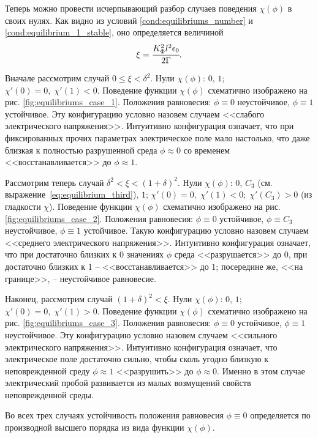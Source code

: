 Теперь можно провести исчерпывающий разбор случаев поведения $\chi(\phi)$ в своих нулях. Как видно из условий \eqref{cond:equilibriums_number} и \eqref{cond:equilibrium_1_stable}, оно определяется величиной
\begin{equation}
	\xi = \cfrac{K_\Phi^2 l^2 \epsilon_0}{2 \Gamma} {\text{.}}
	\label{char:equilibriums}
\end{equation}

Вначале рассмотрим случай $0 \leqslant \xi < \delta^2$. Нули $\chi(\phi)$: $0$, $1$; $\chi'(0) = 0, \; \chi'(1) < 0$. Поведение функции $\chi(\phi)$ схематично изображено на рис. \ref{fig:equilibriums_case_1}. Положения равновесия: $\phi \equiv 0$ неустойчивое, $\phi \equiv 1$ устойчивое. Эту конфигурацию условно назовем случаем <<слабого электрического напряжения>>. Интуитивно конфигурация означает, что при фиксированных прочих параметрах электрическое поле мало настолько, что даже близкая к полностью разрушенной среда $\phi \approx 0$ со временем <<восстанавливается>> до $\phi \approx 1$.

Рассмотрим теперь случай $\delta^2 < \xi < (1 + \delta)^2$. Нули $\chi(\phi)$: $0$, $C_3$ (см. выражение~\eqref{eq:equilibrium_third}), $1$; $\chi'(0) = 0, \; \chi'(1) < 0; \; \chi'(C_3) > 0$ (из гладкости $\chi$). Поведение функции $\chi(\phi)$ схематично изображено на рис. \ref{fig:equilibriums_case_2}. Положения равновесия: $\phi \equiv 0$ устойчивое, $\phi \equiv C_3$ неустойчивое, $\phi \equiv 1$ устойчивое. Такую конфигурацию условно назовем случаем <<среднего электрического напряжения>>. Интуитивно конфигурация означает, что при достаточно близких к $0$ значениях $\phi$ среда <<разрушается>> до $0$, при достаточно близких к $1$ -- <<восстанавливается>> до $1$; посередине же, <<на границе>>, -- неустойчивое равновесие.

Наконец, рассмотрим случай $(1 + \delta)^2 < \xi$. Нули $\chi(\phi)$: $0$, $1$; $\chi'(0) = 0, \; \chi'(1) > 0$. Поведение функции $\chi(\phi)$ схематично изображено на рис. \ref{fig:equilibriums_case_3}. Положения равновесия: $\phi \equiv 0$ устойчивое, $\phi \equiv 1$ неустойчивое. Эту конфигурацию условно назовем случаем <<сильного электрического напряжения>>. Интуитивно конфигурация означает, что электрическое поле достаточно сильно, чтобы сколь угодно близкую к неповрежденной среду $\phi \approx 1$ <<разрушить>> до $\phi \approx 0$. Именно в этом случае электрический пробой развивается из малых возмущений свойств неповрежденной среды.

Во всех трех случаях устойчивость положения равновесия $\phi \equiv 0$ определяется по производной высшего порядка из вида функции $\chi(\phi)$.

